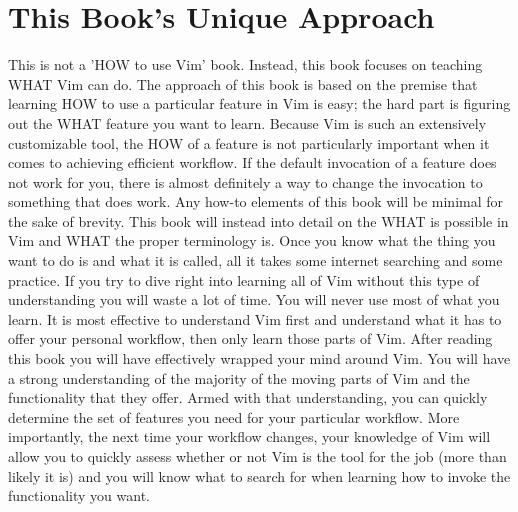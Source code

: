 \documentclass[12pt, oneside]{book}
\begin{document}
\section{This Book's Unique Approach}
This is not a 'HOW to use Vim' book.  Instead, this book focuses on teaching WHAT Vim can do.  The approach of this book is based on the premise that learning HOW to use a particular feature in Vim is
easy; the hard part is figuring out the WHAT feature you want to learn.  Because Vim is such an extensively customizable tool, the HOW of a feature is not particularly important when it comes to
achieving efficient workflow.  If the default invocation of a feature does not work for you, there is almost definitely a way to change the invocation to something that does work.  Any how-to elements
of this book will be minimal for the sake of brevity.  This book will instead into detail on the WHAT is possible in Vim and WHAT the proper terminology is.  Once you know what the thing you want to
do is and what it is called, all it takes some internet searching and some practice.  If you try to dive right into learning all of Vim without this type of understanding you will waste a lot of time.
You will never use most of what you learn.  It is most effective to understand Vim first and understand what it has to offer your personal workflow, then only learn those parts of Vim.  After reading
this book you will have effectively wrapped your mind around Vim.  You will have a strong understanding of the majority of the moving parts of Vim and the functionality that they offer.  Armed with that understanding, you can quickly determine the set of features you need for your particular workflow.  More importantly, the next time your workflow changes, your knowledge of Vim will allow you to quickly assess whether or not Vim is the tool for the job (more than likely it is) and you will know what to search for when learning how to invoke the functionality you want.
\end{document}
